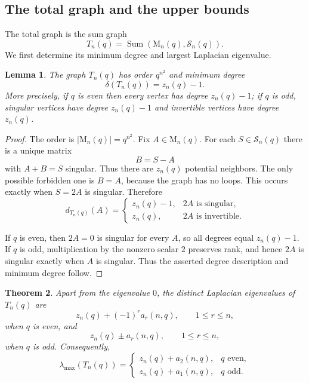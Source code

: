 \documentclass[11pt]{article}
\newtheorem{theorem}{Theorem}[section]
\newtheorem{lemma}[theorem]{Lemma}
\theoremstyle{definition}
\newcommand{\Mat}{\mathrm{M}}
\newcommand{\cS}{\mathcal{S}}
\begin{document}
\subsection{The total graph and the upper bounds}\label{sec:upper}

The total graph is the sum graph
\begin{equation}\label{eq:T-as-sum}
  T_n(q)=\operatorname{Sum}(\Mat_n(q),\cS_n(q)).
\end{equation}
We first determine its minimum degree and largest Laplacian eigenvalue.

\begin{lemma}\label{lem:degree}
The graph $T_n(q)$ has order $q^{n^2}$ and minimum degree
\[
  \delta(T_n(q))=z_n(q)-1.
\]
More precisely, if $q$ is even then every vertex has degree $z_n(q)-1$; if $q$ is odd, singular vertices have degree $z_n(q)-1$ and invertible vertices have degree $z_n(q)$.
\end{lemma}

\begin{proof}
The order is $|\Mat_n(q)|=q^{n^2}$.  Fix $A\in\Mat_n(q)$.  For each $S\in\cS_n(q)$ there is a unique matrix
\[
  B=S-A
\]
with $A+B=S$ singular.  Thus there are $z_n(q)$ potential neighbors.  The only possible forbidden one is $B=A$, because the graph has no loops.  This occurs exactly when $S=2A$ is singular.  Therefore
\[
  d_{T_n(q)}(A)=
  \begin{cases}
  z_n(q)-1,&2A\text{ is singular},\\
  z_n(q),&2A\text{ is invertible}.
  \end{cases}
\]

If $q$ is even, then $2A=0$ is singular for every $A$, so all degrees equal $z_n(q)-1$.  If $q$ is odd, multiplication by the nonzero scalar $2$ preserves rank, and hence $2A$ is singular exactly when $A$ is singular. Thus the asserted degree description and minimum degree follow.
\end{proof}

\begin{theorem}\label{thm:T-spectrum}
Apart from the eigenvalue $0$, the distinct Laplacian eigenvalues of
$T_n(q)$ are
\begin{equation}\label{eq:spectrum-even}
  z_n(q)+(-1)^r a_r(n,q),
  \qquad 1\le r\le n,
\end{equation}
when $q$ is even, and
\begin{equation}\label{eq:spectrum-odd}
  z_n(q)\pm a_r(n,q),
  \qquad 1\le r\le n,
\end{equation}
when $q$ is odd.  Consequently,
\begin{equation}\label{eq:lambda-max}
  \lambda_{\max}(T_n(q))=
  \begin{cases}
  z_n(q)+a_2(n,q),&q\text{ even},\\
  z_n(q)+a_1(n,q),&q\text{ odd}.
  \end{cases}
\end{equation}
\end{theorem}
\end{document}
